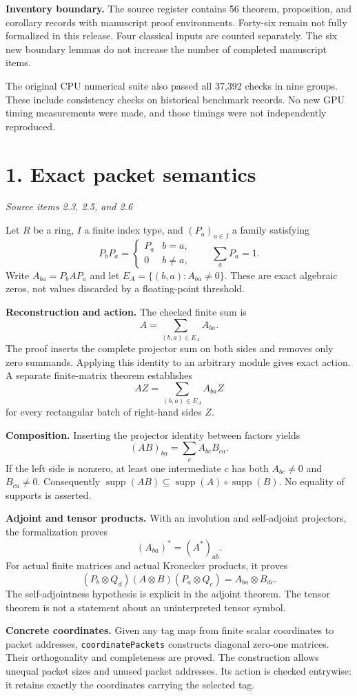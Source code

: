 \documentclass[11pt]{article}
\newcommand{\supp}{\operatorname{supp}}\newcommand{\rank}{\operatorname{rank}}
\newcommand{\code}[1]{\texttt{\small #1}}
\newcommand{\pageheading}[2]{\section*{\color{ink}#1}\textit{#2}\par}
\begin{document}
\textbf{Inventory boundary.} The source register contains 56 theorem, proposition, and corollary records with manuscript proof environments. Forty-six remain not fully formalized in this release. Four classical inputs are counted separately. The six new boundary lemmas do not increase the number of completed manuscript items.

The original CPU numerical suite also passed all 37,392 checks in nine groups. These include consistency checks on historical benchmark records. No new GPU timing measurements were made, and those timings were not independently reproduced.

\newpage
\pageheading{1. Exact packet semantics}{Source items 2.3, 2.5, and 2.6}
Let $R$ be a ring, $I$ a finite index type, and $(P_a)_{a\in I}$ a family satisfying
\[
P_bP_a=\begin{cases}P_a&b=a,\\0&b\ne a,\end{cases}
\qquad \sum_aP_a=1.
\]
Write $A_{ba}=P_bAP_a$ and let $E_A=\{(b,a):A_{ba}\ne0\}$. These are exact algebraic zeros, not values discarded by a floating-point threshold.

\textbf{Reconstruction and action.} The checked finite sum is
\[
\boxed{A=\sum_{(b,a)\in E_A} A_{ba}.}
\]
The proof inserts the complete projector sum on both sides and removes only zero summands. Applying this identity to an arbitrary module gives exact action. A separate finite-matrix theorem establishes
\[
AZ=\sum_{(b,a)\in E_A}A_{ba}Z
\]
for every rectangular batch of right-hand sides $Z$.

\textbf{Composition.} Inserting the projector identity between factors yields
\[
\boxed{(AB)_{ba}=\sum_c A_{bc}B_{ca}.}
\]
If the left side is nonzero, at least one intermediate $c$ has both $A_{bc}\ne0$ and $B_{ca}\ne0$. Consequently $\supp(AB)\subseteq\supp(A)\circ\supp(B)$. No equality of supports is asserted.

\textbf{Adjoint and tensor products.} With an involution and self-adjoint projectors, the formalization proves
\[
(A_{ba})^*=(A^*)_{ab}.
\]
For actual finite matrices and actual Kronecker products, it proves
\[
(P_b\otimes Q_d)(A\otimes B)(P_a\otimes Q_c)
=A_{ba}\otimes B_{dc}.
\]
The self-adjointness hypothesis is explicit in the adjoint theorem. The tensor theorem is not a statement about an uninterpreted tensor symbol.

\textbf{Concrete coordinates.} Given any tag map from finite scalar coordinates to packet addresses, \code{coordinatePackets} constructs diagonal zero-one matrices. Their orthogonality and completeness are proved. The construction allows unequal packet sizes and unused packet addresses. Its action is checked entrywise: it retains exactly the coordinates carrying the selected tag.
\end{document}
